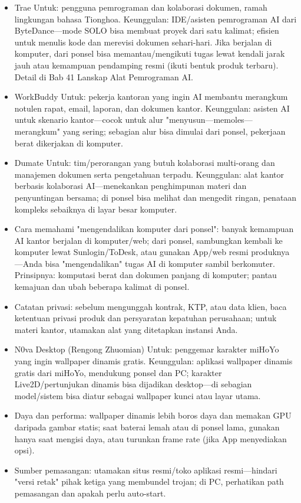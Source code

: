 \begin{itemize}
  \item Trae Untuk: pengguna pemrograman dan kolaborasi dokumen, ramah lingkungan bahasa Tionghoa. Keunggulan: IDE/asisten pemrograman AI dari ByteDance—mode SOLO bisa membuat proyek dari satu kalimat; efisien untuk menulis kode dan merevisi dokumen sehari-hari. Jika berjalan di komputer, dari ponsel bisa memantau/mengikuti tugas lewat kendali jarak jauh atau kemampuan pendamping resmi (ikuti bentuk produk terbaru). Detail di Bab 41 Lanskap Alat Pemrograman AI.
  \item WorkBuddy Untuk: pekerja kantoran yang ingin AI membantu merangkum notulen rapat, email, laporan, dan dokumen kantor. Keunggulan: asisten AI untuk skenario kantor—cocok untuk alur "menyusun—memoles—merangkum" yang sering; sebagian alur bisa dimulai dari ponsel, pekerjaan berat dikerjakan di komputer.
  \item Dumate Untuk: tim/perorangan yang butuh kolaborasi multi-orang dan manajemen dokumen serta pengetahuan terpadu. Keunggulan: alat kantor berbasis kolaborasi AI—menekankan penghimpunan materi dan penyuntingan bersama; di ponsel bisa melihat dan mengedit ringan, penataan kompleks sebaiknya di layar besar komputer.
  \item Cara memahami "mengendalikan komputer dari ponsel": banyak kemampuan AI kantor berjalan di komputer/web; dari ponsel, sambungkan kembali ke komputer lewat Sunlogin/ToDesk, atau gunakan App/web resmi produknya—Anda bisa "mengendalikan" tugas AI di komputer sambil berkomuter. Prinsipnya: komputasi berat dan dokumen panjang di komputer; pantau kemajuan dan ubah beberapa kalimat di ponsel.
  \item Catatan privasi: sebelum mengunggah kontrak, KTP, atau data klien, baca ketentuan privasi produk dan persyaratan kepatuhan perusahaan; untuk materi kantor, utamakan alat yang ditetapkan instansi Anda.
\end{itemize}


\begin{itemize}
  \item N0va Desktop (Rengong Zhuomian) Untuk: penggemar karakter miHoYo yang ingin wallpaper dinamis gratis. Keunggulan: aplikasi wallpaper dinamis gratis dari miHoYo, mendukung ponsel dan PC; karakter Live2D/pertunjukan dinamis bisa dijadikan desktop—di sebagian model/sistem bisa diatur sebagai wallpaper kunci atau layar utama.
  \item Daya dan performa: wallpaper dinamis lebih boros daya dan memakan GPU daripada gambar statis; saat baterai lemah atau di ponsel lama, gunakan hanya saat mengisi daya, atau turunkan frame rate (jika App menyediakan opsi).
  \item Sumber pemasangan: utamakan situs resmi/toko aplikasi resmi—hindari "versi retak" pihak ketiga yang membundel trojan; di PC, perhatikan path pemasangan dan apakah perlu auto-start.
\end{itemize}

